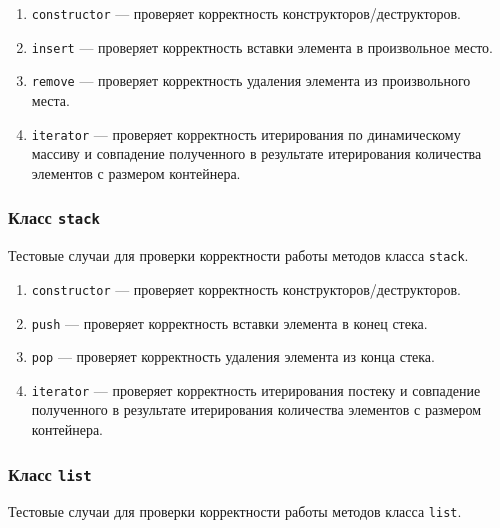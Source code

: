 \documentclass[a4paper,12pt]{article}
\begin{document}
\begin{enumerate}

\item
\verb!constructor! — проверяет корректность конструкторов/деструкторов.

\item
\verb!insert! — проверяет корректность вставки элемента в произвольное место.

\item
\verb!remove! — проверяет корректность удаления элемента из произвольного места.

\item
\verb!iterator! — проверяет корректность итерирования по динамическому массиву и совпадение полученного в результате итерирования количества элементов с размером контейнера.

\end{enumerate}

\subsubsection{Класс {\tt stack}}

Тестовые случаи для проверки корректности работы методов класса {\tt stack}.

\begin{enumerate}

\item
\verb!constructor! — проверяет корректность конструкторов/деструкторов.

\item
\verb!push! — проверяет корректность вставки элемента в конец стека.

\item
\verb!pop! — проверяет корректность удаления элемента из конца стека.

\item
\verb!iterator! — проверяет корректность итерирования постеку и совпадение полученного в результате итерирования количества элементов с размером контейнера.

\end{enumerate}

\subsubsection{Класс {\tt list}}

Тестовые случаи для проверки корректности работы методов класса {\tt list}.
\end{document}
